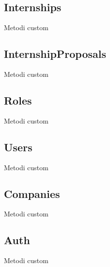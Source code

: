 \subsection{Internships}
Metodi custom

\subsection{InternshipProposals}
Metodi custom

\subsection{Roles}
Metodi custom

\subsection{Users}
Metodi custom

\subsection{Companies}
Metodi custom

\subsection{Auth}
Metodi custom
